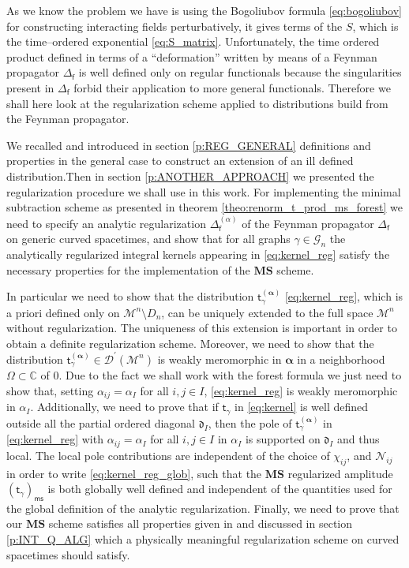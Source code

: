 \documentclass[11pt]{book}
\newcommand{\ms}{\mathsf{ms}}
\newcommand{\MS}{\textbf{MS}}
\newcommand{\alphabd}{\boldsymbol{\alpha}}
\newcommand{\Dcal}{\mathcal{D}}
\newcommand{\Gcal}{\mathcal{G}}
\newcommand{\Mcal}{\mathcal{M}}
\newcommand{\Ncal}{\mathcal{N}}
\newcommand{\Cbb}{\mathbb{C}}
\newcommand{\drak}{\mathfrak{d}}
\newcommand{\fsf}{\mathsf{f}}
\newcommand{\tsf}{\mathsf{t}}
\theoremstyle{break}
\begin{document}
As we know the problem we have is using the Bogoliubov formula \eqref{eq:bogoliubov} for constructing interacting fields perturbatively, it gives terms of the $S$, which is the time--ordered exponential \eqref{eq:S_matrix}. Unfortunately, the time ordered product defined in terms of a ``deformation'' written by means of a Feynman propagator $\Delta_\fsf$ is well defined only on regular functionals because the singularities present in $\Delta_\fsf$ forbid their application to more general functionals. Therefore we shall here look at the regularization scheme applied to distributions build from the Feynman propagator.


We recalled and introduced in section \ref{p:REG_GENERAL} definitions and properties in the general case to construct an extension of an ill defined distribution.Then in section \ref{p:ANOTHER_APPROACH} we presented the regularization procedure we shall use in this work. For implementing the minimal subtraction scheme as presented in theorem \ref{theo:renorm_t_prod_ms_forest} we need to specify an analytic regularization $\Delta^{(\alpha)}_\fsf$ of the Feynman propagator $\Delta_\fsf$ on generic curved spacetimes, and show that for all graphs $\gamma \in \Gcal_n$ the analytically regularized integral kernels appearing in \eqref{eq:kernel_reg} satisfy the necessary properties for the implementation of the $\MS$ scheme.


In particular we need to show that the distribution $\tsf^{(\alphabd)}_\gamma$ \eqref{eq:kernel_reg}, which is a priori defined only on $\Mcal^n \setminus D_n$, can be uniquely extended to the full space $\Mcal^n$ without regularization. The uniqueness of this extension is important in order to obtain a definite regularization scheme. Moreover, we need to show that the distribution $\tsf^{(\alphabd)}_\gamma \in \Dcal^\prime(\Mcal^n)$ is weakly meromorphic in $\alphabd$ in a neighborhood $\Omega \subset \Cbb$ of 0. Due to the fact we shall work with the forest formula we just need to show that, setting $\alpha_{ij} = \alpha_I$ for all $i,j\in I$, \eqref{eq:kernel_reg} is weakly meromorphic in $\alpha_I$. Additionally, we need to prove that if $\tsf_\gamma$ in \eqref{eq:kernel} is well defined outside all the partial ordered diagonal $\drak_I$, then the pole of $\tsf^{(\alphabd)}_\gamma$ in \eqref{eq:kernel_reg} with $\alpha_{ij} = \alpha_I$ for all $i,j\in I$ in $\alpha_I$ is supported on $\drak_I$ and thus local. The local pole contributions are independent of the choice of $\chi_{ij}$, and $\Ncal_{ij}$ in order to write \eqref{eq:kernel_reg_glob}, such that the $\MS$ regularized amplitude $(\tsf_\gamma)_\ms$ is both globally well defined and independent of the quantities used for the global definition of the analytic regularization. Finally, we need to prove that our $\MS$ scheme satisfies all properties given in \cite{hollands_local_2001,hollands_existence_2002} and discussed in section \ref{p:INT_Q_ALG} which a physically meaningful regularization scheme on curved spacetimes should satisfy.
\end{document}
